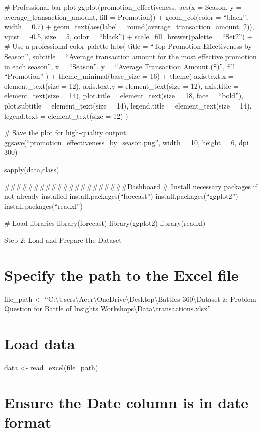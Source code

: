 \documentclass[
]{article}
\begin{document}
\# Professional bar plot ggplot(promotion\_effectiveness, aes(x =
Season, y = average\_transaction\_amount, fill = Promotion)) +
geom\_col(color = ``black'', width = 0.7) + geom\_text(aes(label =
round(average\_transaction\_amount, 2)), vjust = -0.5, size = 5, color =
``black'') + scale\_fill\_brewer(palette = ``Set2'') + \# Use a
professional color palette labs( title = ``Top Promotion Effectiveness
by Season'', subtitle = ``Average transaction amount for the most
effective promotion in each season'', x = ``Season'', y = ``Average
Transaction Amount (\$)'', fill = ``Promotion'' ) +
theme\_minimal(base\_size = 16) + theme( axis.text.x =
element\_text(size = 12), axis.text.y = element\_text(size = 12),
axis.title = element\_text(size = 14), plot.title = element\_text(size =
18, face = ``bold''), plot.subtitle = element\_text(size = 14),
legend.title = element\_text(size = 14), legend.text =
element\_text(size = 12) )

\# Save the plot for high-quality output
ggsave(``promotion\_effectiveness\_by\_season.png'', width = 10, height
= 6, dpi = 300)

sapply(data,class)

\#\#\#\#\#\#\#\#\#\#\#\#\#\#\#\#\#\#\#\#\#Dashboard \# Install necessary
packages if not already installed install.packages(``forecast'')
install.packages(``ggplot2'') install.packages(``readxl'')

\# Load libraries library(forecast) library(ggplot2) library(readxl)

Step 2: Load and Prepare the Dataset

\section{Specify the path to the Excel
file}\label{specify-the-path-to-the-excel-file-1}

file\_path \textless-
``C:\textbackslash Users\textbackslash Acer\textbackslash OneDrive\textbackslash Desktop\textbackslash Battles
360\textbackslash Dataset \& Problem Question for Battle of Insights
Workshops\textbackslash Data\textbackslash transactions.xlsx''

\section{Load data}\label{load-data}

data \textless- read\_excel(file\_path)

\section{Ensure the Date column is in date
format}\label{ensure-the-date-column-is-in-date-format}
\end{document}
